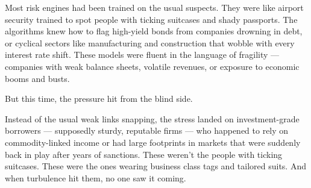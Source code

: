 \medskip

Most risk engines had been trained on the usual suspects.
They were like airport security trained to spot people with ticking suitcases and shady passports. The algorithms knew how to 
flag high-yield bonds from companies drowning in debt, or cyclical sectors like manufacturing and construction that wobble 
with every interest rate shift. These models were fluent in the language of fragility — companies with weak balance sheets, 
volatile revenues, or exposure to economic booms and busts.

But this time, the pressure hit from the blind side.

Instead of the usual weak links snapping, the stress landed on investment-grade borrowers — supposedly sturdy, reputable firms 
— who happened to rely on commodity-linked income or had large footprints in markets that were suddenly back in play after 
years of sanctions. These weren’t the people with ticking suitcases. These were the ones wearing business class tags and 
tailored suits. And when turbulence hit them, no one saw it coming.

\medskip

